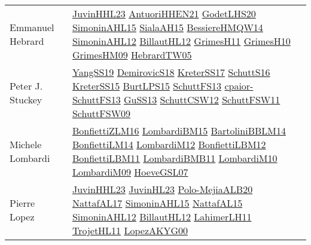 {\begin{longtable}{p{4cm}p{20cm}}
Emmanuel Hebrard & \href{papers/JuvinHHL23.pdf}{JuvinHHL23}\cite{JuvinHHL23} \href{papers/AntuoriHHEN21.pdf}{AntuoriHHEN21}\cite{AntuoriHHEN21} \href{papers/GodetLHS20.pdf}{GodetLHS20}\cite{GodetLHS20} \href{articles/SimoninAHL15.pdf}{SimoninAHL15}\cite{SimoninAHL15} \href{papers/SialaAH15.pdf}{SialaAH15}\cite{SialaAH15} \href{papers/BessiereHMQW14.pdf}{BessiereHMQW14}\cite{BessiereHMQW14} \href{papers/SimoninAHL12.pdf}{SimoninAHL12}\cite{SimoninAHL12} \href{papers/BillautHL12.pdf}{BillautHL12}\cite{BillautHL12} \href{papers/GrimesH11.pdf}{GrimesH11}\cite{GrimesH11} \href{papers/GrimesH10.pdf}{GrimesH10}\cite{GrimesH10} \href{papers/GrimesHM09.pdf}{GrimesHM09}\cite{GrimesHM09} \href{papers/HebrardTW05.pdf}{HebrardTW05}\cite{HebrardTW05} \\
Peter J. Stuckey & \href{papers/YangSS19.pdf}{YangSS19}\cite{YangSS19} \href{papers/DemirovicS18.pdf}{DemirovicS18}\cite{DemirovicS18} \href{articles/KreterSS17.pdf}{KreterSS17}\cite{KreterSS17} \href{papers/SchuttS16.pdf}{SchuttS16}\cite{SchuttS16} \href{papers/KreterSS15.pdf}{KreterSS15}\cite{KreterSS15} \href{papers/BurtLPS15.pdf}{BurtLPS15}\cite{BurtLPS15} \href{papers/SchuttFS13.pdf}{SchuttFS13}\cite{SchuttFS13} \href{papers/cpaior-SchuttFS13.pdf}{cpaior-SchuttFS13}\cite{cpaior-SchuttFS13} \href{papers/GuSS13.pdf}{GuSS13}\cite{GuSS13} \href{papers/SchuttCSW12.pdf}{SchuttCSW12}\cite{SchuttCSW12} \href{articles/SchuttFSW11.pdf}{SchuttFSW11}\cite{SchuttFSW11} \href{papers/SchuttFSW09.pdf}{SchuttFSW09}\cite{SchuttFSW09} \\
Michele Lombardi & \href{papers/BonfiettiZLM16.pdf}{BonfiettiZLM16}\cite{BonfiettiZLM16} \href{papers/LombardiBM15.pdf}{LombardiBM15}\cite{LombardiBM15} \href{papers/BartoliniBBLM14.pdf}{BartoliniBBLM14}\cite{BartoliniBBLM14} \href{papers/BonfiettiLM14.pdf}{BonfiettiLM14}\cite{BonfiettiLM14} \href{articles/LombardiM12.pdf}{LombardiM12}\cite{LombardiM12} \href{papers/BonfiettiLBM12.pdf}{BonfiettiLBM12}\cite{BonfiettiLBM12} \href{papers/BonfiettiLBM11.pdf}{BonfiettiLBM11}\cite{BonfiettiLBM11} \href{papers/LombardiBMB11.pdf}{LombardiBMB11}\cite{LombardiBMB11} \href{papers/LombardiM10.pdf}{LombardiM10}\cite{LombardiM10} \href{papers/LombardiM09.pdf}{LombardiM09}\cite{LombardiM09} \href{papers/HoeveGSL07.pdf}{HoeveGSL07}\cite{HoeveGSL07} \\
Pierre Lopez & \href{papers/JuvinHHL23.pdf}{JuvinHHL23}\cite{JuvinHHL23} \href{papers/JuvinHL23.pdf}{JuvinHL23}\cite{JuvinHL23} \href{}{Polo-MejiaALB20}\cite{Polo-MejiaALB20} \href{articles/NattafAL17.pdf}{NattafAL17}\cite{NattafAL17} \href{articles/SimoninAHL15.pdf}{SimoninAHL15}\cite{SimoninAHL15} \href{articles/NattafAL15.pdf}{NattafAL15}\cite{NattafAL15} \href{papers/SimoninAHL12.pdf}{SimoninAHL12}\cite{SimoninAHL12} \href{papers/BillautHL12.pdf}{BillautHL12}\cite{BillautHL12} \href{papers/LahimerLH11.pdf}{LahimerLH11}\cite{LahimerLH11} \href{articles/TrojetHL11.pdf}{TrojetHL11}\cite{TrojetHL11} \href{articles/LopezAKYG00.pdf}{LopezAKYG00}\cite{LopezAKYG00} \\

\end{longtable}}
